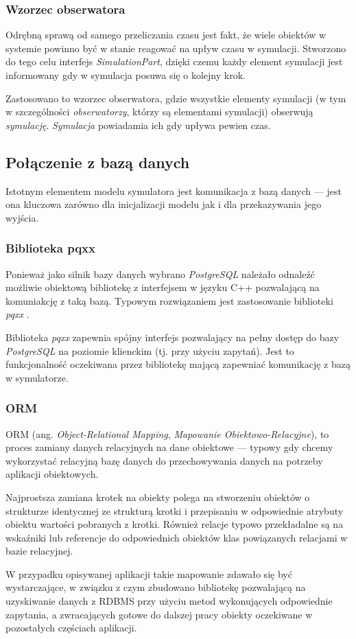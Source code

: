 {{{\subsubsection{Wzorzec obserwatora}
\par{
Odrębną sprawą od samego przeliczania czasu jest fakt, że wiele obiektów w systemie powinno być w stanie reagować na upływ czasu w symulacji. Stworzono do tego celu interfejs \textit{SimulationPart}, dzięki czemu każdy element symulacji jest informowany gdy w symulacja posuwa się o kolejny krok.
}
\par{
Zastosowano to wzorzec obserwatora, gdzie wszystkie elementy symulacji (w tym w szczególności \textit{obserwatorzy}, którzy są elementami symulacji) obserwują \textit{symulację}. \textit{Symulacja} powiadamia ich gdy upływa pewien czas.
}

\subsection{Połączenie z bazą danych}
\par{
Istotnym elementem modelu symulatora jest komunikacja z bazą danych --- jest ona kluczowa zarówno dla inicjalizacji modelu jak i dla przekazywania jego wyjścia.
}
\subsubsection{Biblioteka pqxx}
\par{
Ponieważ jako silnik bazy danych wybrano \textit{PostgreSQL} należało odnaleźć możliwie obiektową bibliotekę z interfejsem w języku C++ pozwalającą na komuniakcję z taką bazą. Typowym rozwiązaniem jest zastosowanie biblioteki \textit{pqxx} \cite{pqxx}.
}
\par{
Biblioteka \textit{pqxx} zapewnia spójny interfejs pozwalający na pełny dostęp do bazy \textit{PostgreSQL} na poziomie klienckim (tj. przy użyciu zapytań). Jest to funkcjonalność oczekiwana przez bibliotekę mającą zapewniać komunikację z bazą w symulatorze.
}
\subsubsection{ORM}
\par{
ORM (ang. \textit{Object-Relational Mapping}, \textit{Mapowanie Obiektowo-Relacyjne}), to proces zamiany danych relacyjnych na dane obiektowe --- typowy gdy chcemy wykorzystać relacyjną bazę danych do przechowywania danych na potrzeby aplikacji obiektowych.
}
\par{
Najprostsza zamiana krotek na obiekty polega na stworzeniu obiektów o strukturze identycznej ze strukturą krotki i przepisaniu w odpowiednie atrybuty obiektu wartości pobranych z krotki. Również relacje typowo przekładalne są na wskaźniki lub referencje do odpowiednich obiektów klas powiązanych relacjami w bazie relacyjnej.
}
\par{
W przypadku opisywanej aplikacji takie mapowanie zdawało się być wystarczające, w związku z czym zbudowano bibliotekę pozwalającą na uzyskiwanie danych z RDBMS przy użyciu metod wykonujących odpowiednie zapytania, a zwracających gotowe do dalszej pracy obiekty oczekiwane w pozostałych częściach aplikacji.
}

}}}
